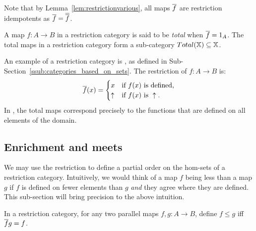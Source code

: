 Note that by Lemma~\ref{lem:restrictionvarious}, all maps $\overline{f}$ are restriction idempotents
as $\overline{f}=\overline{\overline{f}}$.


\begin{definition}\label{def:total_map}
  A map $f:A\to B$ in a restriction category is said to be \emph{total} when
  $\overline{f} = 1_A$. The total maps in a restriction category form a sub-category
  $Total(\mathbb{X}) \subseteq \mathbb{X}$.
\end{definition}


An example of a restriction category is \Par, as defined in
Sub-Section~\ref{ssub:categories_based_on_sets}. The restriction of $f:A\to B$ is:
\[
  \overline{f}(x) =
  \begin{cases}
    x&\text{if $f(x)$ is defined,}\\
    \uparrow&\text{if }f(x)\text{ is }\uparrow.
  \end{cases}
\]
In \Par, the
total maps correspond precisely to the functions that are defined on all elements of the domain.


\subsection{Enrichment and meets} %
\label{sub:enrichment_and_meets}

We may use the restriction to define a partial order on the hom-sets of a restriction
category. Intuitively, we would think of a map $f$ being less than a map $g$ if $f$ is
defined on fewer elements than $g$ \emph{and} they agree where they are defined. This sub-section
will bring precision to the above intuition.

\begin{definition}\label{def:restriction_category_hom_set_ordering}
  In a restriction category, for any two parallel maps  $f,g:A\to B$, define $f \le g$ iff
  $\overline{f} g = f$.

\end{definition}



